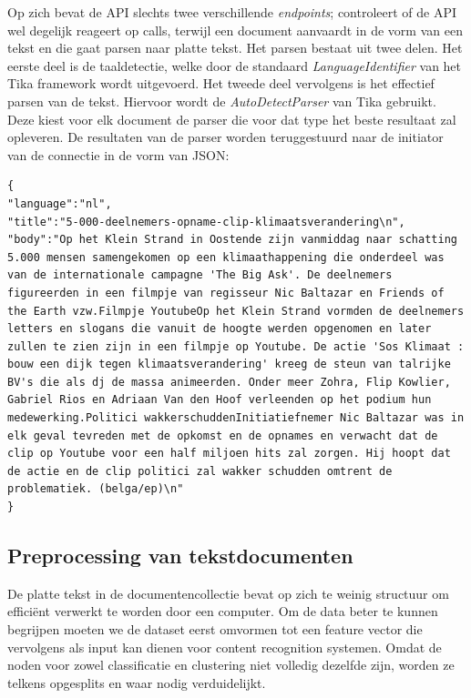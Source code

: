 Op zich bevat de API slechts twee verschillende \textit{endpoints};  controleert of de API wel degelijk reageert op calls, terwijl  een document aanvaardt in de vorm van een tekst en die gaat parsen naar platte tekst. Het parsen bestaat uit twee delen. Het eerste deel is de taaldetectie, welke door de standaard \textit{LanguageIdentifier} van het Tika framework wordt uitgevoerd. Het tweede deel vervolgens is het effectief parsen van de tekst. Hiervoor wordt de \textit{AutoDetectParser} van Tika gebruikt. Deze kiest voor elk document de parser die voor dat type het beste resultaat zal opleveren.
De resultaten van de parser worden teruggestuurd naar de initiator van de connectie in de vorm van JSON:

\begin{lstlisting}
{
"language":"nl",
"title":"5-000-deelnemers-opname-clip-klimaatsverandering\n",
"body":"Op het Klein Strand in Oostende zijn vanmiddag naar schatting 5.000 mensen samengekomen op een klimaathappening die onderdeel was van de internationale campagne 'The Big Ask'. De deelnemers figureerden in een filmpje van regisseur Nic Baltazar en Friends of the Earth vzw.Filmpje YoutubeOp het Klein Strand vormden de deelnemers letters en slogans die vanuit de hoogte werden opgenomen en later zullen te zien zijn in een filmpje op Youtube. De actie 'Sos Klimaat : bouw een dijk tegen klimaatsverandering' kreeg de steun van talrijke BV's die als dj de massa animeerden. Onder meer Zohra, Flip Kowlier, Gabriel Rios en Adriaan Van den Hoof verleenden op het podium hun medewerking.Politici wakkerschuddenInitiatiefnemer Nic Baltazar was in elk geval tevreden met de opkomst en de opnames en verwacht dat de clip op Youtube voor een half miljoen hits zal zorgen. Hij hoopt dat de actie en de clip politici zal wakker schudden omtrent de problematiek. (belga/ep)\n"
}
\end{lstlisting} 

\subsection{Preprocessing van tekstdocumenten}\label{bag-of-words}
De platte tekst in de documentencollectie bevat op zich te weinig structuur om effici\"ent verwerkt te worden door een computer. Om de data beter te kunnen begrijpen moeten we de dataset eerst omvormen tot een feature vector die vervolgens als input kan dienen voor content recognition systemen. Omdat de noden voor zowel classificatie en clustering niet volledig dezelfde zijn, worden ze telkens opgesplits en waar nodig verduidelijkt.

